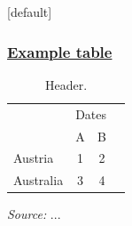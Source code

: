 \documentclass[12pt, ngerman]{beamer}
\begin{document}
\makeatletter
    [default]
    \def\beamer@entrycode{\vspace*{-\headheight}}
\makeatother
\begin{frame}[label=ex_table,noframenumbering]
\frametitle{\hyperlink{introapp}{Example table}}
\begin{table} %
\vspace{-0.5cm}
\scriptsize %
\setlength\tabcolsep{3.5pt}
\centering
\begin{threeparttable}
\caption{Header.} \label{tab:header}
\begin{tabular}{l *{3}{c}}
\hline
\addlinespace \multicolumn{1}{l}{Country} & \multicolumn{2}{c}{Dates} \\
\cmidrule(lr){2-3}
&\multicolumn{1}{c}{A}&\multicolumn{1}{c}{B} \\
\hline
\addlinespace
Austria&         1&         2\\
Australia&         3&         4\\
\hline
\end{tabular}
\begin{tablenotes}
\item \textit{Source:} ...
\end{tablenotes}
\end{threeparttable}
\end{table}
\vspace{0.5cm}
\hyperlink{ex_slide}{} \\
\end{frame}
\end{document}
